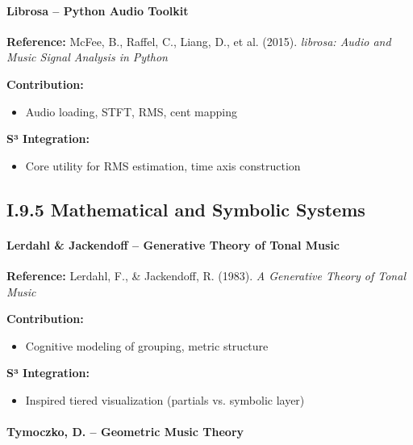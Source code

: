 \paragraph{Librosa – Python Audio Toolkit}

\textbf{Reference:} McFee, B., Raffel, C., Liang, D., et al. (2015). \textit{librosa: Audio and Music Signal Analysis in Python}

\textbf{Contribution:}

\begin{itemize}
    \item Audio loading, STFT, RMS, cent mapping
\end{itemize}

\textbf{S³ Integration:}

\begin{itemize}
    \item Core utility for RMS estimation, time axis construction
\end{itemize}

\subsection*{I.9.5 Mathematical and Symbolic Systems}

\paragraph{Lerdahl \& Jackendoff – Generative Theory of Tonal Music}

\textbf{Reference:} Lerdahl, F., \& Jackendoff, R. (1983). \textit{A Generative Theory of Tonal Music}

\textbf{Contribution:}

\begin{itemize}
    \item Cognitive modeling of grouping, metric structure
\end{itemize}

\textbf{S³ Integration:}

\begin{itemize}
    \item Inspired tiered visualization (partials vs. symbolic layer)
\end{itemize}

\paragraph{Tymoczko, D. – Geometric Music Theory}

